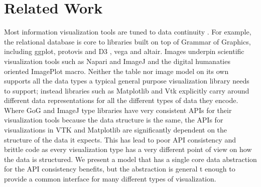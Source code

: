\documentclass[journal]{vgtc}                %
\begin{document}
\section{Related Work}
Most information visualization tools are tuned to data continuity \cite{HeerSoftware2006,toryRethinkingVisualizationHighlevel2004}. For example, the relational database is core to libraries built on top of Grammar of Graphics\cite{wilkinsonGrammarGraphics2005}, including ggplot\cite{wickhamGgplot2ElegantGraphics2016a}, protovis\cite{bostockProtoviz2009} and D3 \cite{bostockDataDrivenDocuments2011}, vega\cite{satyanarayanDeclarativeInteractionDesign2014} and altair\cite{vanderplasAltairInteractiveStatistical2018}. Images underpin scientific visualization tools such as Napari\cite{nicholas_sofroniew_2021_4533308} and ImageJ\cite{schneiderNIHImageImageJ2012} and  the digital humanaties oriented ImagePlot\cite{studiesCulturevisImageplot2021} macro. Neither the table nor image model on its own supports all the data types a typical general purpose visualization library needs to support; instead libraries such as Matplotlib\cite{hunterMatplotlib2DGraphics2007} and Vtk\cite{hanwellVisualizationToolkitVTK2015, geveci2012vtk} explicitly carry around different data representations for all the different types of data they encode.  Where GoG and ImageJ type libraries have very consistent APIs for their visualization tools because the data structure is the same, the APIs for visualizations in VTK and Matplotlib are significantly dependent on the structure of the data it expects. This has lead to poor API consistency and brittle code as every visualization type has a very different point of view on how the data is structured. We present a model that has a single core data abstraction for the API consistency benefits, but the abstraction is general t enough to provide a common interface for many different types of visualization.
\end{document}
